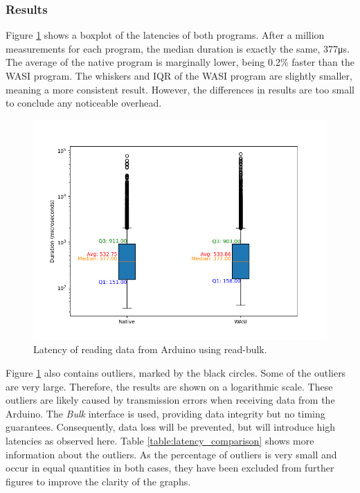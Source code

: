 \subsubsection{Results}
Figure \ref{fig:arduino_reading_latency_boxplot} shows a boxplot of the latencies of both programs. After a million measurements for each program, the median duration is exactly the same, 377μs. The average of the native program is marginally lower, being 0.2\% faster than the \acrshort{WASI} program. The whiskers and IQR of the \acrshort{WASI} program are slightly smaller, meaning a more consistent result. However, the differences in results are too small to conclude any noticeable overhead.

\begin{figure}[H]
  \centering
  \includegraphics[width=1\textwidth]{images/arduino_latency_boxplot.png}
  \caption{Latency of reading data from Arduino using read-bulk.}
  \label{fig:arduino_reading_latency_boxplot}
\end{figure}


Figure \ref{fig:arduino_reading_latency_boxplot} also contains outliers, marked by the black circles. Some of the outliers are very large. Therefore, the results are shown on a logarithmic scale. These outliers are likely caused by transmission errors when receiving data from the Arduino. The \textit{Bulk} interface is used, providing data integrity but no timing guarantees. Consequently, data loss will be prevented, but will introduce high latencies as observed here. Table \ref{table:latency_comparison} shows more information about the outliers. As the percentage of outliers is very small and occur in equal quantities in both cases, they have been excluded from further figures to improve the clarity of the graphs.

